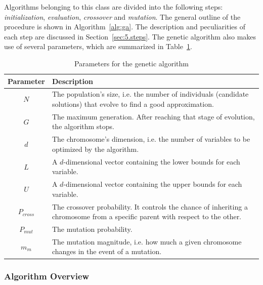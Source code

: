 Algorithms belonging to this class are divided into the following steps:
\textit{initialization}, \textit{evaluation}, \textit{crossover} and \textit{mutation}.
The general outline of the procedure is shown in Algorithm~\ref{alg:ga}.
The description and peculiarities of each step are discussed in Section~\ref{sec:5.steps}.
The genetic algorithm also makes use of several parameters, which are summarized
in Table~\ref{tab:ga_params}.


\begin{table}[]
	\centering
	\begin{tabularx}{\linewidth}{c X}
		\toprule
		\textbf{Parameter} & \textbf{Description} \\ \midrule
		$N$        & The population's size, i.e. the number of individuals (candidate solutions) that evolve to find a good approximation. \\
		$G$         & The maximum generation. After reaching that stage of evolution, the algorithm stops. \\
		$d$           	   & The chromosome's dimension, i.e. the number of variables to be optimized by the algorithm. \\
		$L$           	   & A $d$-dimensional vector containing the lower bounds for each variable. \\
		$U$				   & A $d$-dimensional vector containing the upper bounds for each variable. \\
		$P_{cross}$		   & The crossover probability. It controls the chance of inheriting a chromosome from a specific parent with respect to the other. \\
		$P_{mut}$		   & The mutation probability. \\
		$m_m$			   & The mutation magnitude, i.e. how much a given chromosome changes in the event of a mutation. \\ \bottomrule
	\end{tabularx}
	\caption{Parameters for the genetic algorithm}
	\label{tab:ga_params}
\end{table}

\subsubsection{Algorithm Overview}

